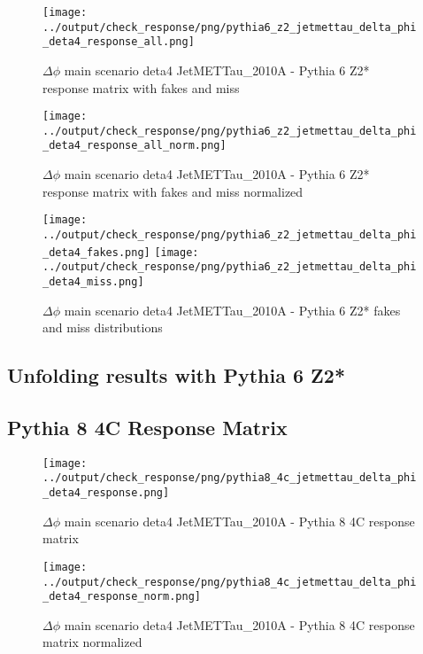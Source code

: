 \documentclass[11pt]{book}
\begin{document}
\begin{figure}[ht]
\centering
\texttt{[image: ../output/check\_response/png/pythia6\_z2\_jetmettau\_delta\_phi\_deta4\_response\_all.png]}
\caption{$\Delta\phi$ main scenario deta4 JetMETTau\_2010A - Pythia 6 Z2* response matrix with fakes and miss}
\label{p6_jetmettau_delta_phi_deta4_response_all}
\end{figure}

\begin{figure}[ht]
\centering
\texttt{[image: ../output/check\_response/png/pythia6\_z2\_jetmettau\_delta\_phi\_deta4\_response\_all\_norm.png]}
\caption{$\Delta\phi$ main scenario deta4 JetMETTau\_2010A - Pythia 6 Z2* response matrix with fakes and miss normalized}
\label{p6_jetmettau_delta_phi_deta4_response_all_norm}
\end{figure}

\begin{figure}[ht]
\centering
\texttt{[image: ../output/check\_response/png/pythia6\_z2\_jetmettau\_delta\_phi\_deta4\_fakes.png]}
\texttt{[image: ../output/check\_response/png/pythia6\_z2\_jetmettau\_delta\_phi\_deta4\_miss.png]}
\caption{$\Delta\phi$ main scenario deta4 JetMETTau\_2010A - Pythia 6 Z2* fakes and miss distributions}
\label{p6_jetmettau_delta_phi_deta4_fakesmiss}
\end{figure}


\clearpage
\subsection{Unfolding results with Pythia 6 Z2*}


\clearpage
\subsection{Pythia 8 4C Response Matrix}


\begin{figure}[ht]
\centering
\texttt{[image: ../output/check\_response/png/pythia8\_4c\_jetmettau\_delta\_phi\_deta4\_response.png]}
\caption{$\Delta\phi$ main scenario deta4 JetMETTau\_2010A - Pythia 8 4C response matrix}
\label{p8_jetmettau_delta_phi_deta4_response}
\end{figure}

\begin{figure}[ht]
\centering
\texttt{[image: ../output/check\_response/png/pythia8\_4c\_jetmettau\_delta\_phi\_deta4\_response\_norm.png]}
\caption{$\Delta\phi$ main scenario deta4 JetMETTau\_2010A - Pythia 8 4C response matrix normalized}
\label{p8_jetmettau_delta_phi_deta4_response_norm}
\end{figure}
\end{document}
